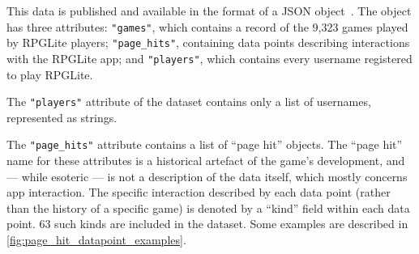 This data is published and available in the format of a JSON
object~\cite{rpglite_dataset}. The object has three attributes:
\lstinline{"games"}, which contains a record of the 9,323 games played by
RPGLite players;  \lstinline{"page_hits"}, containing data points describing
interactions with the RPGLite app; and \lstinline{"players"}, which contains
every username registered to play RPGLite.

The \lstinline{"players"} attribute of the dataset contains only a list of
usernames, represented as strings.

The \lstinline{"page_hits"} attribute contains a list of ``page hit'' objects.
The ``page hit'' name for these attributes is a historical artefact of the
game's development, and --- while esoteric --- is not a description of the data
itself, which mostly concerns app interaction. The specific interaction
described by each data point (rather than the history of a specific game) is
denoted by a ``kind'' field within each data point. 63 such kinds are included in
the dataset. Some examples are described in \cref{fig:page_hit_datapoint_examples}.


